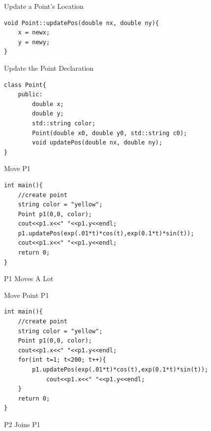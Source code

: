 \documentclass[xcolor={dvipsnames}]{beamer}
\begin{document}
\begin{frame}[fragile]{Update a Point's Location}
\begin{verbatim}
void Point::updatePos(double nx, double ny){
    x = newx;
    y = newy;
}
\end{verbatim}
\end{frame}

\begin{frame}[fragile]{Update the Point Declaration}
\begin{verbatim}
class Point{
    public:
        double x;
        double y;
        std::string color;
        Point(double x0, double y0, std::string c0);
        void updatePos(double nx, double ny);
}
\end{verbatim}
\end{frame}


\begin{frame}[fragile]{Move P1}
\begin{verbatim}
int main(){
    //create point
    string color = "yellow";
    Point p1(0,0, color);
    cout<<p1.x<<" "<<p1.y<<endl;
    p1.updatePos(exp(.01*t)*cos(t),exp(0.1*t)*sin(t));
    cout<<p1.x<<" "<<p1.y<<endl;
    return 0;
}
\end{verbatim}
\end{frame}

\begin{frame}{P1 Moves A Lot}
	\begin{center}
	\end{center}
\end{frame}

\begin{frame}[fragile]{Move Point P1}
\begin{verbatim}
int main(){
    //create point
    string color = "yellow";
    Point p1(0,0, color);
    cout<<p1.x<<" "<<p1.y<<endl;
    for(int t=1; t<200; t++){
        p1.updatePos(exp(.01*t)*cos(t),exp(0.1*t)*sin(t));
            cout<<p1.x<<" "<<p1.y<<endl;
    }
    return 0;
}
\end{verbatim}
\end{frame}

\begin{frame}{P2 Joins P1}
	\begin{center}
	\end{center}
\end{frame}
\end{document}
